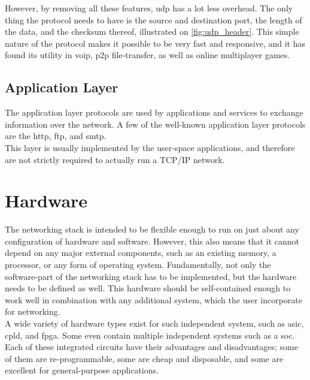 However, by removing all these features, \gls{udp} has a lot less overhead. The
only thing the protocol needs to have is the source and destination port, the
length of the data, and the checksum thereof, illustrated on
\autoref{fig:udp_header}. This simple nature of the protocol makes it possible to
be very fast and responsive, and it has found its utility in \gls{voip},
\gls{p2p} file-transfer, as well as online multiplayer games.

\subsection{Application Layer}
The application layer protocols are used by applications and services to
exchange information over the network. A few of the well-known application
layer protocols are the \gls{http}\cite{RFC1945},
\gls{ftp}\cite{RFC0114}, and \gls{smtp}\cite{RFC0788}.\\
This layer is usually implemented by the user-space applications, and
therefore are not strictly required to actually run a TCP/IP network.



\section{Hardware}
The networking stack is intended to be flexible enough to run on just about any
configuration of hardware and software. However, this also means that it cannot
depend on any major external components, such as an existing memory, a processor,
or any form of operating system. Fundamentally, not only the software-part of the
networking stack has to be implemented, but the hardware needs to be defined
as well. This hardware should be self-contained enough to work well in combination
with any additional system, which the user incorporate for networking.\\
A wide variety of hardware types exist for such independent system, such as
\gls{asic}, \gls{cpld}, and \gls{fpga}. Some even contain multiple independent systems
such as a \gls{soc}.
Each of these integrated circuits have their advantages and disadvantages; some
of them are re-programmable, some are cheap and disposable, and some are excellent
for general-purpose applications.\\



